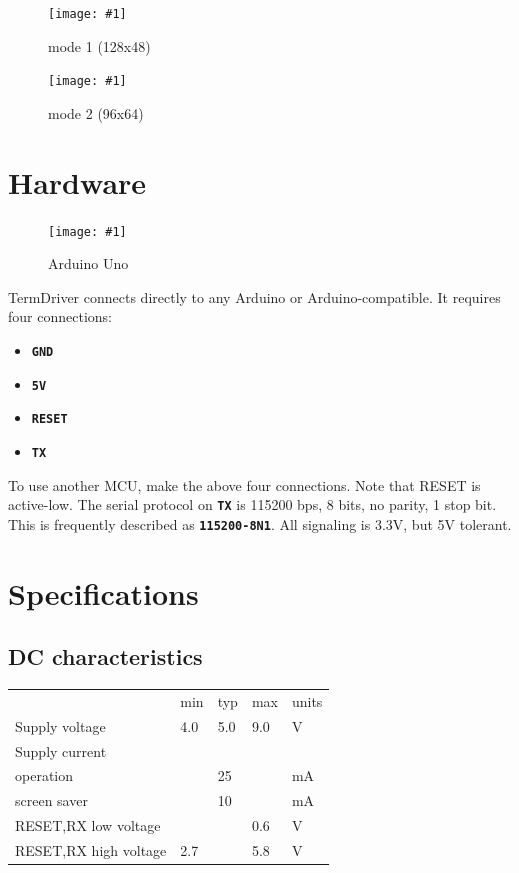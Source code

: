 \documentclass{article}
\newcommand{\heavyline}{\specialrule{1pt}{1pt}{1pt}}
\newcommand{\png}[2]{
\begin{figure}[H]
\begin{center}
\texttt{[image: \#1]}
\caption{#2}
\end{center}
\end{figure}
}
\newcommand{\mach}[1]{\texttt{\textbf{#1}}}
\begin{document}
\png{img/moby1}{mode 1 (128x48)}
\png{img/moby2}{mode 2 (96x64)}

\newpage
\section{Hardware}

\png{img/arduino}{Arduino Uno}

TermDriver connects directly to any Arduino or Arduino-compatible.
It requires four connections:

\begin{itemize}
\item \mach{GND}
\item \mach{5V}
\item \mach{RESET}
\item \mach{TX}
\end{itemize}

\noindent
To use another MCU, make the above four connections. Note that RESET is active-low.
The serial protocol on \mach{TX} is 115200 bps, 8 bits, no parity, 1 stop bit.
This is frequently described as \mach{115200-8N1}.
All signaling is 3.3V, but 5V tolerant.

\newpage
\hypertarget{technical-specifications}{}
\hypertarget{technical-specifications}{%
\section{Specifications}\label{electrical-characteristics}}

\subsection{DC characteristics}
\vspace{10 pt}
{\renewcommand{\arraystretch}{1.2}%

\begin{tabularx}{\linewidth}{XC{40pt}C{40pt}C{40pt}C{40pt}}
\heavyline
& min & typ & max & units \\ \heavyline

Supply voltage & 4.0 & 5.0 & 9.0 & V \\ \hline

Supply current & & & & \\
\hspace{10pt} operation & & 25 & & mA \\
\hspace{10pt} screen saver & & 10 & & mA \\ \hline

RESET,RX low voltage & & & 0.6 & V \\ \hline
RESET,RX high voltage & 2.7 &   & 5.8 & V \\ \hline
\end{tabularx}}
\vspace{10 pt}
\end{document}
